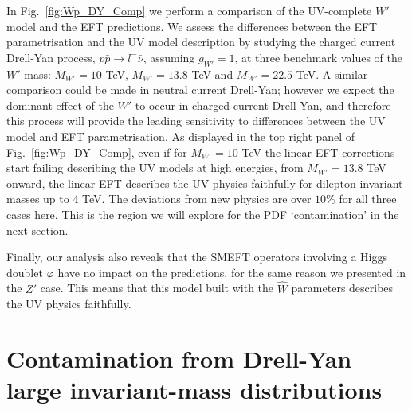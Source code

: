 \documentclass[withindex,glossary]{cam-thesis}
\begin{document}
In Fig.~\ref{fig:Wp_DY_Comp}
we perform a comparison of the UV-complete $W'$ model and the EFT predictions.
We assess the differences between the EFT parametrisation and the UV model description by studying the charged current Drell-Yan process, $p \bar{p} \rightarrow l^- \bar{\nu}$,
assuming $g_{W'} = 1$, at
three benchmark values of the $W'$ mass: $M_{W'} = 10$ TeV, $M_{W'} = 13.8$ TeV and $M_{W'} = 22.5$ TeV.
A similar comparison could be made in neutral current Drell-Yan; however we expect the dominant effect of the $W'$ to occur in charged current Drell-Yan,
and therefore this process will provide the leading sensitivity to differences between the UV model and EFT parametrisation.
As displayed in the top right panel of Fig.~\ref{fig:Wp_DY_Comp}, even if for $M_{W'}=10$ TeV the linear EFT corrections start failing describing the UV models at high energies, from $M_{W'}=13.8$ TeV onward, the linear EFT describes the UV physics faithfully for dilepton invariant masses up to 4 TeV. The deviations from new physics are over $10\%$ for all three cases here.
This is the region we will explore for the PDF `contamination' in the next section.

Finally, our analysis also reveals that the SMEFT operators involving a Higgs doublet $\varphi$ have no impact on the predictions, for the same reason we presented in the $Z'$ case. This means that this model built with the $\hat{W}$ parameters describes the UV physics faithfully.








\section{Contamination from Drell-Yan large invariant-mass
  distributions}
  \label{sec:dy}
\end{document}
